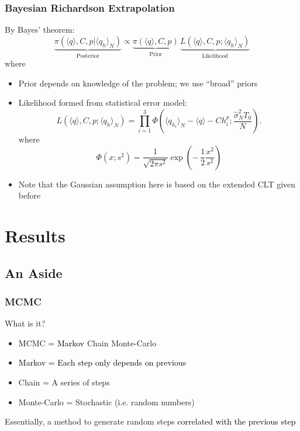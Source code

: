 \documentclass[mathserif]{beamer}
\newcommand{\avg}[1]{\langle #1 \rangle} %
\begin{document}
\begin{frame}
\frametitle{Bayesian Richardson Extrapolation}

By Bayes' theorem:
%
\begin{equation*}
\underbrace{\pi \left(\avg{q}, C, p | \avg{q_h}_N\right)}_{\mathrm{Posterior}} 
\propto 
\underbrace{\pi \left( \avg{q}, C, p \right)}_{\mathrm{Prior}} \, 
\underbrace{L \left(\avg{q}, C, p; \avg{q_h}_N \right)}_{\mathrm{Likelihood}}
\end{equation*}
%
where
%
\begin{itemize}
\item Prior depends on knowledge of the problem; we use ``broad'' priors
\item Likelihood formed from statistical error model:
\begin{equation*}
L \left(\avg{q}, C, p; \avg{q_h}_N \right) = \prod_{i=1}^3 \Phi \left( \avg{q_{h_i}}_N - \avg{q} - C h_i^p; \frac{\hat{\sigma}_N^2 T_0}{N} \right).
\end{equation*}
where
\begin{equation*}
\Phi(x;s^2) = \frac{1}{\sqrt{2 \pi s^2}} \exp \left( -\,\frac{1}{2} \frac{x^2}{s^2} \right)
\end{equation*}
\item Note that the Gaussian assumption here is based on the extended
  CLT given before
\end{itemize}

\end{frame}
%
%
%
\section{Results}

\subsection{An Aside}

\begin{frame}
  \frametitle{MCMC}

  \begin{block}{What is it?}
    \begin{itemize}
    \item \textcolor{black}{M}CMC = \textcolor{black}{Markov} Chain Monte-Carlo
    \item \textcolor{black}{Markov = Each step only depends on previous}
    \item Chain = A series of steps
    \item Monte-Carlo = Stochastic (i.e. random numbers)
    \end{itemize}
    Essentially, a method to generate random steps \textcolor{black}{correlated with the previous step}

  \end{block}
\end{frame}
\end{document}
